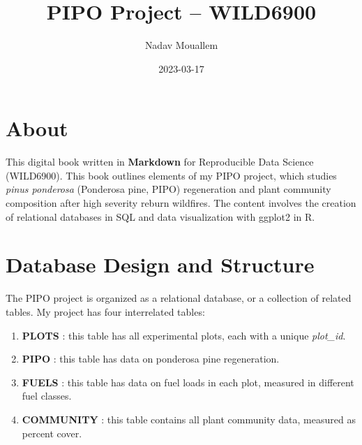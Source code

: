 \documentclass[
]{book}
\title{PIPO Project -- WILD6900}
\author{Nadav Mouallem}
\date{2023-03-17}
\begin{document}
\maketitle

{
\setcounter{tocdepth}{1}
\tableofcontents
}
\hypertarget{about}{%
\chapter{About}\label{about}}

This digital book written in \textbf{Markdown} for Reproducible Data Science (WILD6900).
This book outlines elements of my PIPO project, which studies \emph{pinus ponderosa} (Ponderosa pine, PIPO) regeneration
and plant community composition after high severity reburn wildfires. The content involves the creation of relational
databases in SQL and data visualization with ggplot2 in R.

\hypertarget{database-design-and-structure}{%
\chapter{Database Design and Structure}\label{database-design-and-structure}}

The PIPO project is organized as a relational database, or a collection of related tables.
My project has four interrelated tables:

\begin{enumerate}
\def\labelenumi{\arabic{enumi}.}
\item
  \textbf{PLOTS} : this table has all experimental plots, each with a unique \emph{plot\_id}.
\item
  \textbf{PIPO} : this table has data on ponderosa pine regeneration.
\item
  \textbf{FUELS} : this table has data on fuel loads in each plot, measured in different fuel classes.
\item
  \textbf{COMMUNITY} : this table contains all plant community data, measured as percent cover.
\end{enumerate}
\end{document}
